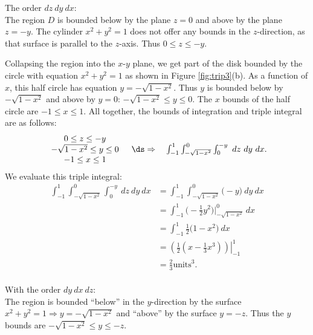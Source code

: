 {The order $dz\ dy\ dx$:\\

The region $D$ is bounded below by the plane $z=0$ and above by the plane $z=-y$. The cylinder $x^2+y^2=1$ does not offer any bounds in the $z$-direction, as that surface is parallel to the $z$-axis. Thus $0\leq z\leq -y$.

Collapsing the region into the $x$-$y$ plane, we get part of the disk bounded by the circle with equation $x^2+y^2=1$ as shown in Figure \ref{fig:trip3}(b). As a function of $x$, this half circle has equation $y=-\sqrt{1-x^2}$. Thus $y$ is bounded below by $-\sqrt{1-x^2}$ and above by $y=0$: $-\sqrt{1-x^2}\leq y\leq 0$. The $x$ bounds of the half circle are $-1\leq x\leq 1$. All together, the bounds of integration and triple integral are  as follows:
$$\begin{array}{cc}
		\begin{array}{c}
		0\leq z\leq -y\\
		-\sqrt{1-x^2}\leq y\leq 0\\
		-1\leq x\leq 1
		\end{array} 
		&
		\ds\Rightarrow \quad \int_{-1}^1\int_{-\sqrt{1-x^2}}^{0}\int_0^{-y}\ dz\ dy\ dx.
	\end{array}
$$
We evaluate this triple integral:
\begin{align*}
\int_{-1}^1\int_{-\sqrt{1-x^2}}^{0}\int_0^{-y}\ dz\ dy\ dx &= \int_{-1}^1\int_{-\sqrt{1-x^2}}^{0}\big(-y\big)\ dy\ dx\\
				&=\int_{-1}^1\big(-\frac12y^2\big)\Big|_{-\sqrt{1-x^2}}^{0}\ dx\\
				&= \int_{-1}^1 \frac12\big(1-x^2\big)\ dx\\
				&= \left.\left(\frac12\left(x-\frac13x^3\right)\right)\right|_{-1}^1\\
				&= \frac23\text{units}^3.
\end{align*}\\
\noindent With the order $dy\ dx\ dz$:\\

The region is bounded ``below'' in the $y$-direction by the surface $x^2+y^2=1 \Rightarrow y=-\sqrt{1-x^2}$ and ``above'' by the surface $y=-z$. Thus the $y$ bounds are $-\sqrt{1-x^2}\leq y\leq -z$.


}
